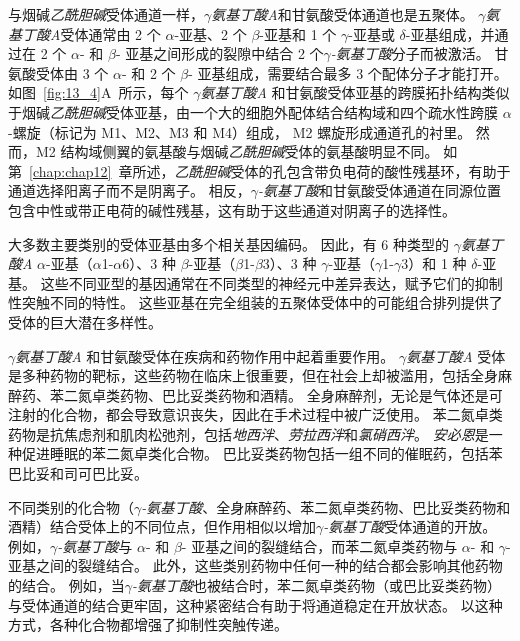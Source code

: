 与烟碱\textit{乙酰胆碱}受体通道一样，\textit{$\gamma$氨基丁酸A}和甘氨酸受体通道也是五聚体。
\textit{$\gamma$氨基丁酸A}受体通常由 2 个 $\alpha$-亚基、2 个 $\beta$-亚基和 1 个 $\gamma$-亚基或 $\delta$-亚基组成，并通过在 2 个 $\alpha$- 和 $\beta$- 亚基之间形成的裂隙中结合 2 个\textit{$\gamma$-氨基丁酸}分子而被激活。
甘氨酸受体由 3 个 $\alpha$- 和 2 个 $\beta$- 亚基组成，需要结合最多 3 个配体分子才能打开。
如图~\ref{fig:13_4}A~所示，每个 \textit{$\gamma$氨基丁酸A} 和甘氨酸受体亚基的跨膜拓扑结构类似于烟碱\textit{乙酰胆碱}受体亚基，由一个大的细胞外配体结合结构域和四个疏水性跨膜 $\alpha$-螺旋（标记为 M1、M2、M3 和 M4）组成， M2 螺旋形成通道孔的衬里。
然而，M2 结构域侧翼的氨基酸与烟碱\textit{乙酰胆碱}受体的氨基酸明显不同。
如第~\ref{chap:chap12}~章所述，\textit{乙酰胆碱}受体的孔包含带负电荷的酸性残基环，有助于通道选择阳离子而不是阴离子。
相反，\textit{$\gamma$-氨基丁酸}和甘氨酸受体通道在同源位置包含中性或带正电荷的碱性残基，这有助于这些通道对阴离子的选择性。


大多数主要类别的受体亚基由多个相关基因编码。
因此，有 6 种类型的 \textit{$\gamma$氨基丁酸A} $\alpha$-亚基（$\alpha$1-$\alpha$6）、3 种 $\beta$-亚基（$\beta$1-$\beta$3）、3 种 $\gamma$-亚基（$\gamma$1-$\gamma$3）和 1 种 $\delta$-亚基。
这些不同亚型的基因通常在不同类型的神经元中差异表达，赋予它们的抑制性突触不同的特性。
这些亚基在完全组装的五聚体受体中的可能组合排列提供了受体的巨大潜在多样性。


\textit{$\gamma$氨基丁酸A} 和甘氨酸受体在疾病和药物作用中起着重要作用。
\textit{$\gamma$氨基丁酸A} 受体是多种药物的靶标，这些药物在临床上很重要，但在社会上却被滥用，包括全身麻醉药、苯二氮卓类药物、巴比妥类药物和酒精。
全身麻醉剂，无论是气体还是可注射的化合物，都会导致意识丧失，因此在手术过程中被广泛使用。
苯二氮卓类药物是抗焦虑剂和肌肉松弛剂，包括\textit{地西泮}、\textit{劳拉西泮}和\textit{氯硝西泮}。
\textit{安必恩}是一种促进睡眠的苯二氮卓类化合物。
巴比妥类药物包括一组不同的催眠药，包括苯巴比妥和司可巴比妥。


不同类别的化合物（\textit{$\gamma$-氨基丁酸}、全身麻醉药、苯二氮卓类药物、巴比妥类药物和酒精）结合受体上的不同位点，但作用相似以增加\textit{$\gamma$-氨基丁酸}受体通道的开放。
例如，\textit{$\gamma$-氨基丁酸}与 $\alpha$- 和 $\beta$- 亚基之间的裂缝结合，而苯二氮卓类药物与 $\alpha$- 和 $\gamma$- 亚基之间的裂缝结合。
此外，这些类别药物中任何一种的结合都会影响其他药物的结合。
例如，当\textit{$\gamma$-氨基丁酸}也被结合时，苯二氮卓类药物（或巴比妥类药物）与受体通道的结合更牢固，这种紧密结合有助于将通道稳定在开放状态。
以这种方式，各种化合物都增强了抑制性突触传递。


